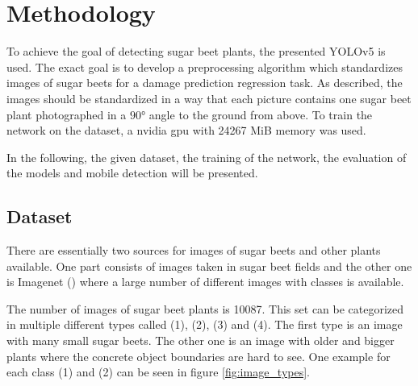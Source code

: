 
\chapter{Methodology}

To achieve the goal of detecting sugar beet plants, the presented YOLOv5 is used. The exact goal is to develop a preprocessing algorithm which standardizes images of sugar beets for a damage prediction regression task. As described, the images should be standardized in a way that each picture contains one sugar beet plant photographed in a $ 90° $ angle to the ground from above. To train the network on the dataset, a nvidia gpu with 24267 MiB memory was used.

In the following, the given dataset, the training of the network, the evaluation of the models and mobile detection  will be presented.

\section{Dataset}

There are essentially two sources for images of sugar beets and other plants available. One part consists of images taken in sugar beet fields and the other one is Imagenet (\cite{deng2009imagenet}) where a large number of different images with classes is available.

The number of images of sugar beet plants is 10087. This set can be categorized in multiple different types called (1), (2), (3) and (4). The first type is an image with many small sugar beets. The other one is an image with older and bigger plants where the concrete object boundaries are hard to see. One example for each class (1) and (2) can be seen in figure \ref{fig:image_types}.

